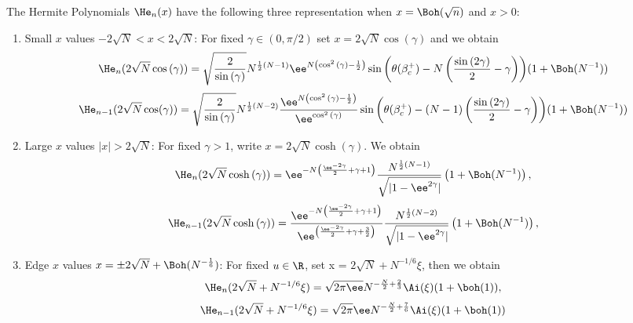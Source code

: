 {\begin{teorema}
	The Hermite Polynomials $\He_n(x)$ have the following three representation when $x = \Boh(\sqrt{n})$ and $x > 0$:
	\begin{enumerate}
		\item Small $x$ values $-2\sqrt{N} < x < 2\sqrt{N}$: For fixed $\gamma \in (0, \pi/2)$ set $x = 2\sqrt{N} \cos{(\gamma)}$ and we obtain
		\begin{equation}
			\He_n(2\sqrt{N}\cos{(\gamma)}) = \sqrt{\frac{2}{\sin{(\gamma)}}}
			N^{\frac{1}{2} \left(N - 1\right)}
			\ee^{N\left(\cos^2{(\gamma)} - \frac{1}{2} \right)} 
			\sin{
				\left(
				\theta(\beta_c^+) 
				-N\left(\frac{\sin{(2\gamma)}}{2}
				-\gamma\right)
				\right)
			} 
			(1 + \Boh(N^{-1}))
			\label{Eq: Hermite small asymptotic (n)}
		\end{equation}
		\begin{equation}
			\He_{n-1}(2\sqrt{N}\cos(\gamma)) = \sqrt{\frac{2}{\sin{(\gamma)}}}
			N^{\frac{1}{2} \left(N -2\right)}
			\frac{\ee^{N\left(\cos^2{(\gamma)} - \frac{1}{2} \right)}}{\ee^{\cos^2{(\gamma)}}}
			\sin{
				\left(
				\theta(\beta_c^+) 
				-(N-1)\left(\frac{\sin{(2\gamma)}}{2}
				-\gamma\right)
				\right)
			} 
			(1 + \Boh(N^{-1}))
			\label{Eq: Hermite small asymptotic (n-1)}
		\end{equation}
		\item Large $x$ values $|x| > 2\sqrt{N}$: For fixed $\gamma > 1$, write $x = 2\sqrt{N} \cosh{(\gamma)}$. We obtain
		\begin{equation}
			\He_n(2\sqrt{N}\cosh{(\gamma)}) = \ee^{-N\left( \frac{\ee^{-2\gamma}}{2} + \gamma +  1\right)} \frac{N^{\frac{1}{2}\left(N - 1\right)}}{\sqrt{|1 - \ee^{2\gamma}|}} 
			\left(1 + \Boh(N^{-1}) \right),
			\label{Eq: Hermite large asymptotic (n)}
		\end{equation}
		\begin{equation}
			\He_{n-1}(2\sqrt{N}\cosh{(\gamma)}) = \frac{\ee^{-N\left( \frac{\ee^{-2\gamma}}{2} + \gamma +  1\right)}}{\ee^{\left( \frac{\ee^{-2\gamma}}{2} + \gamma + \frac{3}{2}\right)}} \frac{N^{\frac{1}{2}\left(N -2\right)}}{\sqrt{|1 - \ee^{2\gamma}|}} \left(1 + \Boh(N^{-1}) \right),
			\label{Eq: Hermite large asymptotic (n-1)}
		\end{equation}
		\item Edge $x$ values $x = \pm 2\sqrt{N} + \Boh(N^{-\frac{1}{6}})$: For fixed $u \in \R$, set x = $2\sqrt{N} + N^{-1/6}\xi$, then we obtain
		\begin{equation}
			\He_n(2\sqrt{N} + N^{-1/6}\xi) = \sqrt{2\pi\ee} N^{-\frac{N}{2} + \frac{2}{3}}  \Ai(\xi) (1 + \boh(1)),
			\label{Eq: Hermite edge asymptotic (n)}
		\end{equation}
		\begin{equation}
			\He_{n-1}(2\sqrt{N} + N^{-1/6}\xi) = \sqrt{2\pi} \ee N^{-\frac{N}{2} + \frac{7}{6}}  \Ai(\xi) (1 + \boh(1))
			\label{Eq: Hermite edge asymptotic (n-1)}
		\end{equation}
	\end{enumerate}
\end{teorema}

}

